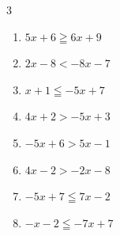 \begin{multicols}{3}
\begin{enumerate}
  \item $5x+6\geqq 6x+9$

        \phantom{$\displaystyle x\leqq -3$}

  \item $2x-8<-8x-7$


  \item $x+1\leqq -5x+7$

        \phantom{$\displaystyle x\leqq 1$}

  \item $4x+2>-5x+3$


  \item $-5x+6>5x-1$


  \item $4x-2>-2x-8$

        \phantom{$\displaystyle x>-1$}

  \item $-5x+7\leqq 7x-2$


  \item $-x-2\leqq -7x+7$


\end{enumerate}
\end{multicols}

\newpage
\resetdrill

